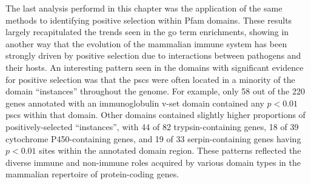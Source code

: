 The last analysis performd in this chapter was the application of the
same \sw methods to identifying positive selection within Pfam
domains. These results largely recapitulated the trends seen in the
\ac{go} term enrichments, showing in another way that the evolution of
the mammalian immune system has been strongly driven by positive
selection due to interactions between pathogens and their hosts. An
interesting pattern seen in the domains with significant evidence for
positive selection was that the \acp{psc} were often located in a
minority of the domain ``instances'' throughout the genome. For
example, only 58 out of the 220 genes annotated with an immunoglobulin
v-set domain contained any $p<0.01$ \acp{psc} within that
domain. Other domains contained slightly higher proportions of
positively-selected ``instances'', with 44 of 82 trypsin-containing
genes, 18 of 39 cytochrome P450-containing genes, and 19 of 33
serpin-containing genes having $p<0.01$ sites within the annotated
domain region. These patterns reflected the diverse immune and
non-immune roles acquired by various domain types in the mammalian
repertoire of protein-coding genes.
